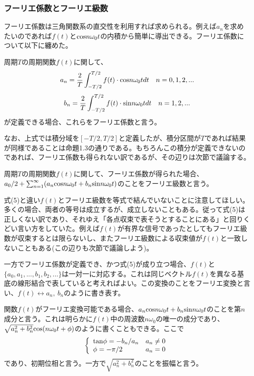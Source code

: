 \documentclass[dvipdfmx, 9pt, a4paper]{jsarticle}
\begin{document}
\subsubsection{フーリエ係数とフーリエ級数}
フーリエ係数は三角関数系の直交性を利用すれば求められる。例えば$a_n$を求めたいのであれば$f(t)$と${\rm cos}n\omega_0t$の内積から簡単に導出できる。フーリエ係数について以下に纏めた。
\begin{tcolorbox}[title=フーリエ係数]
周期$T$の周期関数$f(t)$に関して、
\begin{equation}
a_n=\frac{2}{T}\int_{-T/2}^{T/2}f(t)\cdot {\rm cos}n\omega_0t dt~~~n=0,1,2,... \notag
\end{equation}
\begin{equation}
b_n=\frac{2}{T}\int_{-T/2}^{T/2}f(t)\cdot {\rm sin}n\omega_0t dt~~~n=1,2,... \notag
\end{equation}
が定義できる場合、これらをフーリエ係数と言う。
\end{tcolorbox}
なお、上式では積分域を$[-T/2,T/2]$と定義したが、積分区間が$T$であれば結果が同様であることは命題1.3の通りである。もちろんこの積分が定義できないのであれば、フーリエ係数も得られない訳であるが、その辺りは次節で議論する。
\begin{tcolorbox}[title=フーリエ級数]
周期$T$の周期関数$f(t)$に関して、フーリエ係数が得られた場合、$a_0/2+\sum_{n=1}^\infty(a_n{\rm cos}n\omega_0t+b_n{\rm sin}n\omega_0t)$のことをフーリエ級数と言う。
\end{tcolorbox}
式(5)と違い$f(t)$とフーリエ級数を等式で結んでいないことに注意してほしい。多くの場合、両者の等号は成立するが、成立しないこともある。従って式(5)は正しくない訳であり、それゆえ「各点収束で表そうとすることにある」と回りくどい言い方をしていた。例えば$f(t)$が有界な信号であったとしてもフーリエ級数が収束するとは限らないし、またフーリエ級数による収束値が$f(t)$と一致しないこともある(この辺りも次節で議論しよう)。\par
一方でフーリエ係数が定義でき、かつ式(5)が成り立つ場合、$f(t)$と$\{a_0, a_1, ..., b_1, b_2, ... \}$は一対一に対応する。これは同じベクトル$f(t)$を異なる基底の線形結合で表していると考えればよい。この変換のことをフーリエ変換と言い、$f(t)\leftrightarrow a_n,~b_n$のように書き表す。\par
関数$f(t)$がフーリエ変換可能である場合、$a_n{\rm cos}n\omega_0t+b_n{\rm sin}n\omega_0t$のことを第$n$成分と言う。これは明らかに$f(t)$中の周波数$n\omega_0$の唯一の成分であり、$\sqrt{a_n^2+b_n^2}{\rm cos}(n\omega_0t+\phi)$のように書くこともできる。ここで
\begin{equation}
\left\{
\begin{array}{ll}
{\rm tan}\phi=-b_n/a_n & a_n \neq 0 \\
\phi=-\pi/2 & a_n=0
\end{array}\right. \notag
\end{equation}
であり、初期位相と言う。一方で$\sqrt{a_n^2+b_n^2}$のことを振幅と言う。
\end{document}
